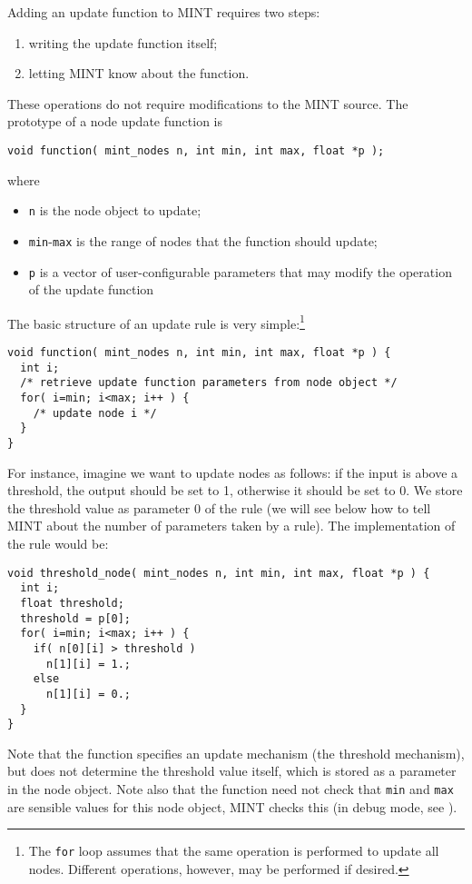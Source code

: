 \documentclass[12pt,letterpaper]{memoir}
\let\fref\relax%
\newcommand{\mint}{MINT\xspace}
\begin{document}
Adding an update function to \mint requires two steps:
\begin{enumerate}
\item writing the update function itself;
\item letting \mint know about the function.
\end{enumerate}
These operations do not require modifications to the \mint source.
The prototype of a node update function is
\begin{lstlisting}
void function( mint_nodes n, int min, int max, float *p );
\end{lstlisting}
where
\begin{itemize}
\item \lstinline{n} is the node object to update;
\item \lstinline{min}-\lstinline{max} is the range of nodes that the
  function should update;
\item \lstinline{p} is a vector of user-configurable parameters that
  may modify the operation of the update function 
\end{itemize}
The basic structure of an  update rule is very simple:\footnote{The
  \lstinline{for} loop assumes that the same operation is performed to
update all nodes. Different operations, however, may be performed if
desired.}
\begin{lstlisting}
void function( mint_nodes n, int min, int max, float *p ) {
  int i;
  /* retrieve update function parameters from node object */
  for( i=min; i<max; i++ ) {
    /* update node i */
  }
}  
\end{lstlisting}
For instance, imagine we want to update nodes as follows: if the input
is above a threshold, the output should be set to 1, otherwise it
should be set to 0. We store the threshold value as parameter 0 of the
rule (we will see below how to tell \mint about the number of
parameters taken by a rule). The implementation of the rule would be:
\begin{lstlisting}
void threshold_node( mint_nodes n, int min, int max, float *p ) {
  int i;
  float threshold;
  threshold = p[0];
  for( i=min; i<max; i++ ) {
    if( n[0][i] > threshold )
      n[1][i] = 1.;
    else
      n[1][i] = 0.;
  }
}  
\end{lstlisting}
Note that the function specifies an update mechanism (the threshold
mechanism), but does not determine the threshold value itself, which
is stored as a parameter in the node object.  Note also that the
function need not check that \lstinline{min} and \lstinline{max} are
sensible values for this node object, \mint checks this (in debug
mode, see \fref{sec:debugging}).
\end{document}
